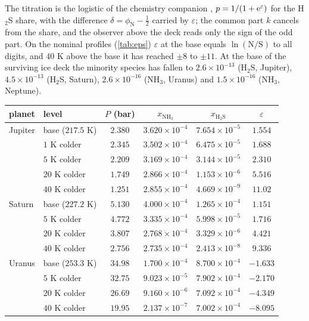 \documentclass[11pt]{article}
\theoremstyle{definition}\newtheorem{definition}[theorem]{Definition}
\theoremstyle{remark}\newtheorem{remark}[theorem]{Remark}
\newcommand{\NH}{\mathrm{NH_3}}\newcommand{\HS}{\mathrm{H_2S}}\newcommand{\NHSH}{\mathrm{NH_4SH}}
\begin{document}
The titration is the logistic of the chemistry companion \cite{SChem}, $p=1/(1+\mathrm e^{\varepsilon})$ for the H$_2$S share, with the difference $\delta=\phi_\mathrm{N}-\frac12$ carried by $\varepsilon$; the common part $k$ cancels from the share, and the observer above the deck reads only the sign of the odd part. On the nominal profiles (\cref{tab:eps}) $\varepsilon$ at the base equals $\ln(\mathrm N/\mathrm S)$ to all digits, and $40$ K above the base it has reached $\pm8$ to $\pm11$. At the base of the surviving ice deck the minority species has fallen to $2.6\times10^{-13}$ (H$_2$S, Jupiter), $4.5\times10^{-13}$ (H$_2$S, Saturn), $2.6\times10^{-16}$ (NH$_3$, Uranus) and $1.5\times10^{-16}$ (NH$_3$, Neptune).

\begin{table}[!htb]\centering\footnotesize
\begin{tabular}{@{}llcccc@{}}\toprule
planet & level & $P$ (bar) & $x_{\NH}$ & $x_{\HS}$ & $\varepsilon$\\\midrule
Jupiter & base ($217.5$ K) & $2.380$ & $3.620\times10^{-4}$ & $7.654\times10^{-5}$ & $1.554$\\
 & $1$ K colder & $2.345$ & $3.502\times10^{-4}$ & $6.475\times10^{-5}$ & $1.688$\\
 & $5$ K colder & $2.209$ & $3.169\times10^{-4}$ & $3.144\times10^{-5}$ & $2.310$\\
 & $20$ K colder & $1.749$ & $2.866\times10^{-4}$ & $1.153\times10^{-6}$ & $5.516$\\
 & $40$ K colder & $1.251$ & $2.855\times10^{-4}$ & $4.669\times10^{-9}$ & $11.02$\\
Saturn & base ($227.2$ K) & $5.130$ & $4.000\times10^{-4}$ & $1.265\times10^{-4}$ & $1.151$\\
 & $5$ K colder & $4.772$ & $3.335\times10^{-4}$ & $5.998\times10^{-5}$ & $1.716$\\
 & $20$ K colder & $3.807$ & $2.768\times10^{-4}$ & $3.329\times10^{-6}$ & $4.421$\\
 & $40$ K colder & $2.756$ & $2.735\times10^{-4}$ & $2.413\times10^{-8}$ & $9.336$\\
Uranus & base ($253.3$ K) & $34.98$ & $1.700\times10^{-4}$ & $8.700\times10^{-4}$ & $-1.633$\\
 & $5$ K colder & $32.75$ & $9.023\times10^{-5}$ & $7.902\times10^{-4}$ & $-2.170$\\
 & $20$ K colder & $26.69$ & $9.160\times10^{-6}$ & $7.092\times10^{-4}$ & $-4.349$\\
 & $40$ K colder & $19.95$ & $2.137\times10^{-7}$ & $7.002\times10^{-4}$ & $-8.095$\\

\end{tabular}
\end{table}
\end{document}
